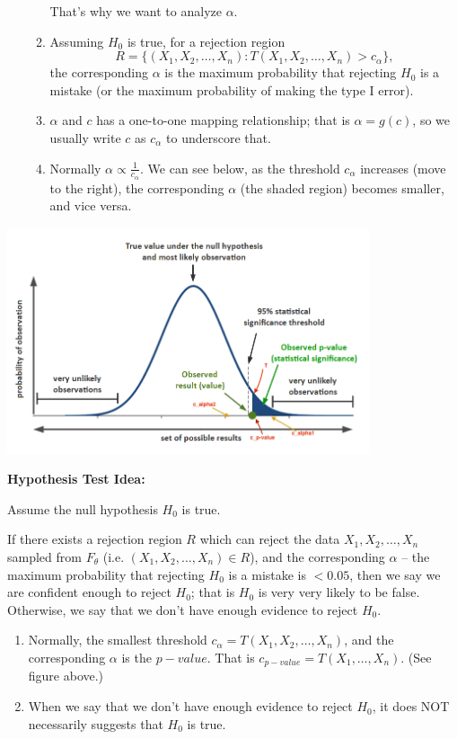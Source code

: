 \documentclass[13pt]{article}
\theoremstyle{definition}
\theoremstyle{remark}
\newenvironment{remark}
  {\pushQED{\qed}\renewcommand{\qedsymbol}{$\triangle$}\remarkx}
  {\popQED\endremarkx}
\begin{document}
\begin{enumerate}[label=(\arabic*)]
\begin{enumerate}[label=(\alph*)]
    That's why we want to analyze $\alpha$.
        \item Assuming $H_0$ is true, {\color{C2}for a rejection region \[R=\{(X_1, X_2, \ldots, X_n):T(X_1, X_2, \ldots, X_n)>c_{\alpha}\},\] the corresponding $\alpha$ is the maximum probability that rejecting $H_0$ is a mistake (or the maximum probability of making the type I error)}.
        \item $\alpha$ and $c$ has a one-to-one mapping relationship; that is $\alpha = g(c)$, so we usually write $c$ as $c_{\alpha}$ to underscore that.
        \item Normally $\alpha \propto \frac{1}{c_{\alpha}}$. We can see below, as the threshold $c_{\alpha}$ increases (move to the right), the corresponding $\alpha$ (the shaded region) becomes smaller, and vice versa.
    \end{enumerate}
\end{enumerate}

\begin{center}
    \includegraphics[width=0.8\textwidth]{p_value.png}
    \end{center}
\textbf{Hypothesis Test Idea:}

Assume the null hypothesis $H_0$ is true. 

If there exists a rejection region $R$ which can reject the data $X_1, X_2, \ldots, X_n$ sampled from $F_{\theta}$ (i.e. $(X_1, X_2, \ldots, X_n)\in R$), and the corresponding $\alpha$ -- the maximum probability that rejecting $H_0$ is a mistake is $<0.05$, then we say we are confident enough to reject $H_0$; that is $H_0$ is very very likely to be false. Otherwise, we say that we don't have enough evidence to reject $H_0$.

\begin{remark}\hfill
\begin{enumerate}
    \item Normally, the smallest threshold $c_{\alpha}=T(X_1, X_2, \ldots, X_n)$, and the corresponding $\alpha$ is the $p-value$. That is $c_{p-value}=T(X_1, \ldots, X_n)$. (See figure above.)
    \item When we say that we don't have enough evidence to reject $H_0$, it does NOT necessarily suggests that $H_0$ is true.
\end{enumerate}
\end{remark}
\end{document}
